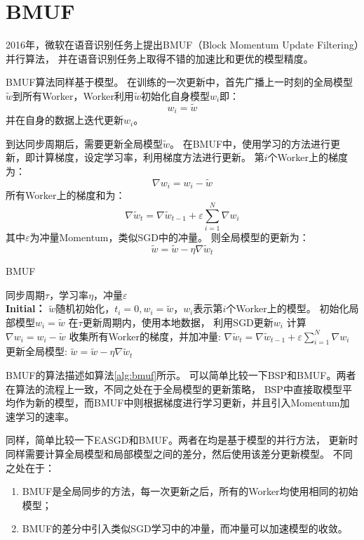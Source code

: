 \section{BMUF} 

2016年，微软在语音识别任务上提出BMUF（Block Momentum Update Filtering）并行算法，
并在语音识别任务上取得不错的加速比和更优的模型精度。

BMUF算法同样基于模型。
在训练的一次更新中，首先广播上一时刻的全局模型$\tilde w$到所有Worker，Worker利用$\tilde w$初始化自身模型$w_i$即：
\begin{equation}
w_i = \tilde w
\end{equation}
并在自身的数据上迭代更新$w_i$。

到达同步周期后，需要更新全局模型$\tilde w$。
在BMUF中，使用学习的方法进行更新，即计算梯度，设定学习率，利用梯度方法进行更新。
第$i$个Worker上的梯度为：
\begin{equation}
\nabla {w_i} = {w_i} - \tilde w
\end{equation}
所有Worker上的梯度和为：
\begin{equation}
\nabla {{\tilde w}_t} = \nabla {{\tilde w}_{t - 1}} + \varepsilon \sum\limits_{i = 1}^N {\nabla {w_i}}
\end{equation}
其中$\varepsilon$为冲量Momentum，类似SGD中的冲量。
则全局模型的更新为：
\begin{equation}
\tilde w = \tilde w - \eta \nabla {{\tilde w}_t}
\end{equation}

\begin{algorithm}
\label{alg:bmuf}
\caption{BMUF}
\begin{algorithmic}
\REQUIRE 同步周期$\tau$，学习率$\eta$，冲量$\varepsilon$ \\

\textbf{Initial：} $\tilde w$随机初始化，$t_i=0, w_i=\tilde w$，$w_i$表示第$i$个Worker上的模型。
\REPEAT
{}
\STATE 初始化局部模型$w_i = \tilde w$
\STATE 在$\tau$更新周期内，使用本地数据， 利用SGD更新$w_i$
\STATE 计算$\nabla {w_i} = {w_i} - \tilde w$
\ENDFOR
\STATE 收集所有Worker的梯度，并加冲量:
    $\nabla {{\tilde w}_t} = \nabla {{\tilde w}_{t - 1}} + \varepsilon \sum\limits_{i = 1}^N {\nabla {w_i}}$
\STATE 更新全局模型: $\tilde w = \tilde w - \eta \nabla {{\tilde w}_t}$
\end{algorithmic}
\end{algorithm}

BMUF的算法描述如算法\ref{alg:bmuf}所示。
可以简单比较一下BSP和BMUF。两者在算法的流程上一致，不同之处在于全局模型的更新策略，
BSP中直接取模型平均作为新的模型，而BMUF中则根据梯度进行学习更新，并且引入Momentum加速学习的速率。

同样，简单比较一下EASGD和BMUF。两者在均是基于模型的并行方法，
更新时同样需要计算全局模型和局部模型之间的差分，然后使用该差分更新模型。
不同之处在于：
\begin{enumerate}
\item BMUF是全局同步的方法，每一次更新之后，所有的Worker均使用相同的初始模型；
\item BMUF的差分中引入类似SGD学习中的冲量，而冲量可以加速模型的收敛。
\end{enumerate}